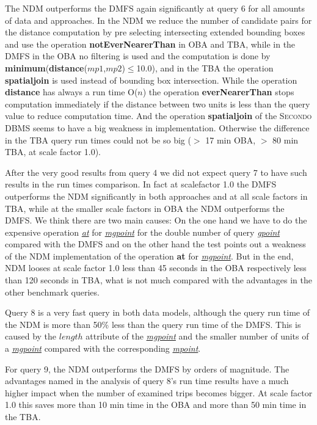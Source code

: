 \documentclass[a4paper]{article}
\newcommand{\secondo}{\textsc{Secondo}}
\newcommand{\op}[1]{\textbf{#1}}
\newcommand{\dt}[1]{\textsl{\underline{#1}}}
\begin{document}
The NDM outperforms the DMFS again significantly at query 6
for all amounts of data and approaches. In the NDM we reduce the number of candidate
pairs for the distance computation by pre selecting intersecting extended bounding boxes
and use the operation \op{notEverNearerThan} in OBA and TBA, while in the DMFS
in the OBA no filtering is used and the computation is done by
\op{minimum}(\op{distance}($mp1$,$mp2$)$\leq$10.0), and in the TBA the operation
\op{spatialjoin} is used instead of bounding box intersection. While the operation
\op{distance} has always a run time O($n$) the operation \op{everNearerThan}
stops computation immediately if the distance between two units is less than the
query value to reduce computation time. And the operation \op{spatialjoin} of the
\secondo{} DBMS seems to have a big weakness in implementation. Otherwise the
difference in the TBA query run times could not be so big ($>$ 17 min OBA, $>$
80 min TBA, at scale factor 1.0).

After the very good results from query 4 we did not expect query 7 to have such
results in the run times comparison. In fact at scalefactor 1.0 the DMFS outperforms
the NDM significantly in both
approaches and at all scale factors in TBA, while at the smaller scale factors in
OBA the NDM outperforms the DMFS. We think there are two main causes: On the one hand we
have to do the expensive operation \dt{at} for \dt{mgpoint} for the double number
of query \dt{gpoint} compared with the DMFS and
on the other hand the test points out a weakness of the NDM
implementation of the operation \op{at} for \dt{mgpoint}. But in the end, NDM looses
at scale factor 1.0 less than 45 seconds in the OBA respectively less
than 120 seconds in TBA, what is not much compared with the advantages in the
other benchmark queries.

Query 8 is a very fast query in both data models, although the query run time of
the NDM is more than 50\% less than the query run time of the
DMFS. This is caused by the
$length$ attribute of the \dt{mgpoint} and the smaller number of units of a
\dt{mgpoint} compared with the corresponding \dt{mpoint}.

For query 9, the NDM outperforms the DMFS by orders of magnitude. The advantages
named in the analysis of query 8's run time results have a much higher impact
when the number of examined trips becomes bigger. At scale factor 1.0 this saves
more than 10 min time in the OBA and more than 50 min time in the TBA.
\end{document}
